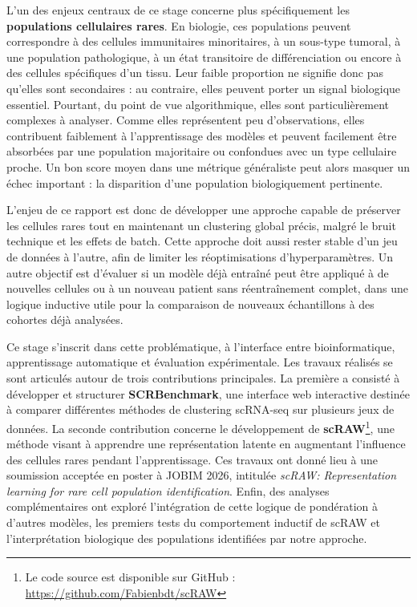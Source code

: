 L'un des enjeux centraux de ce stage concerne plus spécifiquement les \textbf{populations cellulaires rares}. En biologie, ces populations peuvent correspondre à des cellules immunitaires minoritaires, à un sous-type tumoral, à une population pathologique, à un état transitoire de différenciation ou encore à des cellules spécifiques d'un tissu. Leur faible proportion ne signifie donc pas qu'elles sont secondaires : au contraire, elles peuvent porter un signal biologique essentiel. Pourtant, du point de vue algorithmique, elles sont particulièrement complexes à analyser. Comme elles représentent peu d'observations, elles contribuent faiblement à l'apprentissage des modèles et peuvent facilement être absorbées par une population majoritaire ou confondues avec un type cellulaire proche. Un bon score moyen dans une métrique généraliste peut alors masquer un échec important : la disparition d'une population biologiquement pertinente.

L'enjeu de ce rapport est donc de développer une approche capable de préserver les cellules rares tout en maintenant un clustering global précis, malgré le bruit technique et les effets de batch. Cette approche doit aussi rester stable d'un jeu de données à l'autre, afin de limiter les réoptimisations d'hyperparamètres. Un autre objectif est d'évaluer si un modèle déjà entraîné peut être appliqué à de nouvelles cellules ou à un nouveau patient sans réentraînement complet, dans une logique inductive utile pour la comparaison de nouveaux échantillons à des cohortes déjà analysées.

Ce stage s'inscrit dans cette problématique, à l'interface entre bioinformatique, apprentissage automatique et évaluation expérimentale. Les travaux réalisés se sont articulés autour de trois contributions principales. La première a consisté à développer et structurer \textbf{SCRBenchmark}, une interface web interactive destinée à comparer différentes méthodes de clustering scRNA-seq sur plusieurs jeux de données. La seconde contribution concerne le développement de \textbf{scRAW}\footnote{Le code source est disponible sur GitHub : \url{https://github.com/Fabienbdt/scRAW}}, une méthode visant à apprendre une représentation latente en augmentant l'influence des cellules rares pendant l'apprentissage. Ces travaux ont donné lieu à une soumission acceptée en poster à JOBIM 2026, intitulée \textit{scRAW: Representation learning for rare cell population identification}. Enfin, des analyses complémentaires ont exploré l'intégration de cette logique de pondération à d'autres modèles, les premiers tests du comportement inductif de scRAW et l'interprétation biologique des populations identifiées par notre approche.

